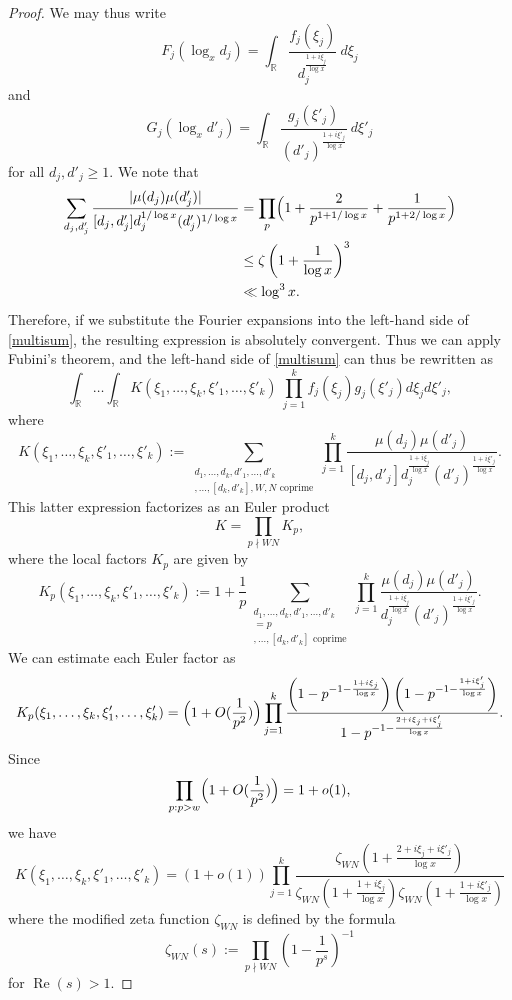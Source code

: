 \documentclass{bmcart}
\theoremstyle{plain}
\theoremstyle{definition}
\newcommand\R{\mathbb{R}}
\renewcommand\Re{\operatorname{Re}}
\begin{document}
\begin{proof}
We may thus write
$$ F_j( \log_x d_j ) = \int_\R \frac{f_j(\xi_j)}{d_j^{\frac{1+i\xi_j}{\log x}}}\ d\xi_j$$
and
$$ G_j( \log_x d'_j ) = \int_\R \frac{g_j(\xi'_j)}{(d'_j)^{\frac{1+i\xi'_j}{\log x}}}\ d\xi'_j$$
for all $d_j,d'_j \geq 1$.
We note that
\begin{align*}
 \sum_{d_j,d_j'}\frac{|\mu(d_j)\mu(d_j')|}{[d_j,d_j']d_j^{1/\log{x}}(d_j')^{1/\log{x}}} &= \prod_{p}\Bigl(1+\frac{2}{p^{1+1/\log{x}}}+\frac{1}{p^{1+2/\log{x}}}\Bigr) \\
&\leq \zeta\left(1+\frac{1}{\log x}\right)^3 \\
&\ll \log^3 x.
\end{align*}
Therefore, if we substitute the Fourier expansions into the left-hand side of \eqref{multisum}, the resulting expression is absolutely convergent. Thus we can apply Fubini's theorem, and the left-hand side of \eqref{multisum} can thus be rewritten as
\begin{equation}\label{fg-int}
 \int_\R \dots \int_\R K(\xi_1,\dots,\xi_k,\xi'_1,\dots,\xi'_k)\ \prod_{j=1}^k f_j(\xi_j) g_j(\xi'_j) d\xi_j d\xi'_j,
\end{equation}
where
$$ K(\xi_1,\dots,\xi_k,\xi'_1,\dots,\xi'_k) := 
\sum_{\substack{d_1, \dots, d_k, d'_1, \dots, d'_k \\ [d_1,d'_1], \dots, [d_k,d'_k], W, N \text{ coprime}}} 
\prod_{j=1}^k \frac{\mu(d_j) \mu(d'_j)}{[d_j,d'_j] d_j^{\frac{1+i\xi_j}{\log x}} (d'_j)^{\frac{1+i\xi'_j}{\log x}}}.$$
This latter expression factorizes as an Euler product 
$$ K = \prod_{p\nmid WN} K_p, $$
where the local factors $K_p$ are given by
\begin{equation}\label{kp}
 K_p(\xi_1,\dots,\xi_k,\xi'_1,\dots,\xi'_k)
 := 1 + \frac{1}{p}
\sum_{\substack{d_1,\dots,d_k,d'_1,\dots,d'_k \\ [d_1, \dots, d_k, d'_1, \dots, d'_k]=p \\ [d_1,d'_1],\dots,[d_k,d'_k] \text{ coprime}}} 
\prod_{j=1}^k \frac{\mu(d_j) \mu(d'_j)}{d_j^{\frac{1+i\xi_j}{\log x}} (d'_j)^{\frac{1+i\xi'_j}{\log x}}}.
\end{equation}
We can estimate each Euler factor as
\begin{equation}\label{kp-est}
 K_p(\xi_1,\dots,\xi_k,\xi'_1,\dots,\xi'_k) = \Bigl(1+O(\frac{1}{p^2})\Bigr) \prod_{j=1}^k \frac{\left(1 - p^{-1-\frac{1+i\xi_j}{\log x}}\right)\left(1 - p^{-1-\frac{1+i\xi'_j}{\log x}}\right)}{1 - p^{-1-\frac{2+i\xi_j+i\xi'_j}{\log x}}}.
\end{equation}
Since 
$$ 
\prod_{p: p>w} \Bigl(1 + O(\frac{1}{p^2})\Bigr) = 1 + o(1),$$
we have
$$
 K(\xi_1,\dots,\xi_k,\xi'_1,\dots,\xi'_k) = (1+o(1)) \prod_{j=1}^k \frac{ \zeta_{W N}( 1 + \frac{2+i\xi_j+i\xi'_j}{\log x}) }{ \zeta_{W N}(1 + \frac{1+i\xi_j}{\log x}) \zeta_{W N}(1 + \frac{1+i\xi'_j}{\log x}) } $$
where the modified zeta function $\zeta_{WN}$ is defined by the formula
$$ \zeta_{W N}(s) := \prod_{p\nmid W N} \left(1-\frac{1}{p^s}\right)^{-1}$$
for $\Re(s) > 1$.  


\end{proof}
\end{document}
